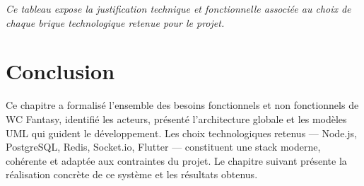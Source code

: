 \vspace{0.2cm}
\noindent\small\textit{Ce tableau expose la justification technique et fonctionnelle associée au choix de chaque brique technologique retenue pour le projet.}\normalsize

\newpage
\section*{Conclusion}

Ce chapitre a formalisé l'ensemble des besoins fonctionnels et non fonctionnels de WC Fantasy, identifié les acteurs, présenté l'architecture globale et les modèles UML qui guident le développement. Les choix technologiques retenus --- Node.js, PostgreSQL, Redis, Socket.io, Flutter --- constituent une stack moderne, cohérente et adaptée aux contraintes du projet. Le chapitre suivant présente la réalisation concrète de ce système et les résultats obtenus.

